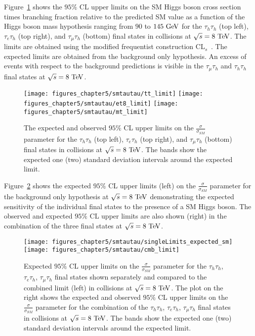Figure~\ref{fig:ind} shows the $95\%$ CL upper limits on the SM Higgs boson cross section times branching fraction relative to the predicted SM value as a function of the Higgs boson mass hypothesis ranging from $90$ to $145~\mathrm{Ge\kern -0.1em V}$ for the $\tau_{h}\tau_{h}$ (top left), $\tau_{e}\tau_{h}$ (top right), and $\tau_{\mu}\tau_{h}$ (bottom) final states in collisions at $\sqrt{s}=8~\mathrm{Te\kern -0.1em V}$. The limits are obtained using the modified frequentist construction CL$_{s}$~\cite{Read, Read2}.  The expected limits are obtained from the background only hypothesis. An excess of events with respect to the background predictions is visible in the $\tau_{\mu}\tau_h$ and $\tau_{h}\tau_h$ final states at $\sqrt{s}=8~\mathrm{Te\kern -0.1em V}$.
\begin{figure}[htbp]
\centering
\texttt{[image: figures\_chapter5/smtautau/tt\_limit]}
\texttt{[image: figures\_chapter5/smtautau/et8\_limit]}
\texttt{[image: figures\_chapter5/smtautau/mt\_limit]}
\caption{The expected and observed $95\%$ CL upper limits on the $\frac{\sigma}{\sigma_{SM}}$ parameter for the $\tau_{h}\tau_{h}$ (top left), $\tau_{e}\tau_{h}$ (top right), and $\tau_{\mu}\tau_{h}$ (bottom) final states in collisions at $\sqrt{s}=8~\mathrm{Te\kern -0.1em V}$. The bands show the expected one (two) standard deviation intervals around the expected limit.}
\label{fig:ind}
\end{figure}
Figure~\ref{fig:cmblim}  shows the expected $95\%$ CL upper limits (left) on the  $\frac{\sigma}{\sigma_{SM}}$ parameter for the background only hypothesis at $\sqrt{s}=8~\mathrm{Te\kern -0.1em V}$ demonstrating the expected sensitivity of the individual final states to the presence of a SM Higgs boson. The observed and expected $95\%$ CL upper limits are also shown (right) in the combination of the three final states at $\sqrt{s}=8~\mathrm{Te\kern -0.1em V}$. 
\begin{figure}[htbp]
\centering
\texttt{[image: figures\_chapter5/smtautau/singleLimits\_expected\_sm]}
\texttt{[image: figures\_chapter5/smtautau/cmb\_limit]}
\caption{Expected $95\%$ CL upper limits on the $\frac{\sigma}{\sigma_{SM}}$ parameter for the $\tau_{h}\tau_{h}$, $\tau_{e}\tau_{h}$, $\tau_{\mu}\tau_{h}$ final states shown separately and compared to the combined limit (left) in collisions at $\sqrt{s}=8~\mathrm{Te\kern -0.1em V}$. The plot on the right shows the expected and observed $95\%$ CL upper limits on the $\frac{\sigma}{\sigma_{SM}}$ parameter for the combination of the $\tau_{h}\tau_{h}$, $\tau_{e}\tau_{h}$, $\tau_{\mu}\tau_{h}$ final states in collisions at $\sqrt{s}=8~\mathrm{Te\kern -0.1em V}$. The bands show the expected one (two) standard deviation intervals around the expected limit.}
\label{fig:cmblim}
\end{figure}

